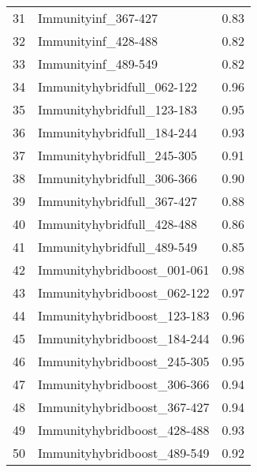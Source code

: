 \begin{table}[ht]
\begin{tabular}{rlr}
  31 & Immunityinf\_367-427 & 0.83 \\ 
  32 & Immunityinf\_428-488 & 0.82 \\ 
  33 & Immunityinf\_489-549 & 0.82 \\ 
  34 & Immunityhybridfull\_062-122 & 0.96 \\ 
  35 & Immunityhybridfull\_123-183 & 0.95 \\ 
  36 & Immunityhybridfull\_184-244 & 0.93 \\ 
  37 & Immunityhybridfull\_245-305 & 0.91 \\ 
  38 & Immunityhybridfull\_306-366 & 0.90 \\ 
  39 & Immunityhybridfull\_367-427 & 0.88 \\ 
  40 & Immunityhybridfull\_428-488 & 0.86 \\ 
  41 & Immunityhybridfull\_489-549 & 0.85 \\ 
  42 & Immunityhybridboost\_001-061 & 0.98 \\ 
  43 & Immunityhybridboost\_062-122 & 0.97 \\ 
  44 & Immunityhybridboost\_123-183 & 0.96 \\ 
  45 & Immunityhybridboost\_184-244 & 0.96 \\ 
  46 & Immunityhybridboost\_245-305 & 0.95 \\ 
  47 & Immunityhybridboost\_306-366 & 0.94 \\ 
  48 & Immunityhybridboost\_367-427 & 0.94 \\ 
  49 & Immunityhybridboost\_428-488 & 0.93 \\ 
  50 & Immunityhybridboost\_489-549 & 0.92 \\ 
   \hline
\end{tabular}
\end{table}
